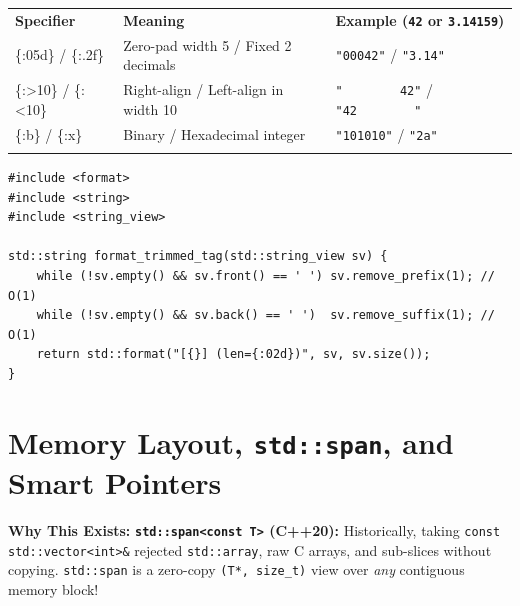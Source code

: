 \documentclass[11pt,a4paper]{article}
\newcommand{\whybeat}{\textbf{\color{accentteal}Why This Exists:} }
\begin{document}
\begingroup\footnotesize{}
\begin{tabularx}{\textwidth}{>{\raggedright\arraybackslash\ttfamily}p{2.8cm} >{\raggedright\arraybackslash}X >{\raggedright\arraybackslash}p{4.6cm}}
\arrayrulecolor{primaryblue}\toprule[1.1pt]
\rowcolor{primaryblue!10}
\textcolor{primaryblue}{\normalfont\bfseries Specifier} & \textcolor{primaryblue}{\textbf{Meaning}} & \textcolor{primaryblue}{\textbf{Example (\texttt{42} or \texttt{3.14159})}} \\
\arrayrulecolor{codeframe}\midrule[0.6pt]
\{:05d\} / \{:.2f\} & Zero-pad width 5 / Fixed 2 decimals & \texttt{"00042"} / \texttt{"3.14"} \\
\{:>10\} / \{:<10\} & Right-align / Left-align in width 10 & \texttt{"\ \ \ \ \ \ \ \ 42"} / \texttt{"42\ \ \ \ \ \ \ \ "} \\
\{:b\} / \{:x\} & Binary / Hexadecimal integer & \texttt{"101010"} / \texttt{"2a"} \\
\arrayrulecolor{primaryblue}\bottomrule[1.1pt]
\end{tabularx}\endgroup

\begin{lstlisting}[caption={Zero-copy \texttt{std::string\_view} trimming and \texttt{std::format} (C++20)}]
#include <format>
#include <string>
#include <string_view>

std::string format_trimmed_tag(std::string_view sv) {
    while (!sv.empty() && sv.front() == ' ') sv.remove_prefix(1); // O(1)
    while (!sv.empty() && sv.back() == ' ')  sv.remove_suffix(1); // O(1)
    return std::format("[{}] (len={:02d})", sv, sv.size());
}
\end{lstlisting}

\section{Memory Layout, \texttt{std::span}, and Smart Pointers}

\whybeat \textbf{\texttt{std::span<const T>} (C++20):} Historically, taking \texttt{const std::vector<int>\&} rejected \texttt{std::array}, raw C arrays, and sub-slices without copying. \texttt{std::span} is a zero-copy \texttt{(T*, size\_t)} view over \emph{any} contiguous memory block!
\end{document}
